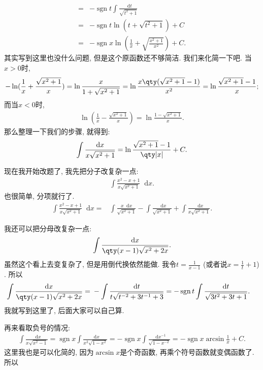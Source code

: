 \documentclass{ctexbook}
\DeclareMathOperator{\sgn}{sgn}
\newcommand*{\dif}{\mathop{}\!\mathrm{d}}
\begin{document}
{\begin{align*}
={}&-\sgn{t}\int\frac{\dif{t}}{\sqrt{t^{2}+1}}\\
={}&-\sgn{t}\ln(t+\sqrt{t^{2}+1})+C\\
={}&-\sgn{x}\ln(\frac{1}{x}+\sqrt{\frac{x^{2}+1}{x^{2}}})+C
.\end{align*}
其实写到这里也没什么问题, 但是这个原函数还不够简洁. 我们来化简一下吧. 当$x>0$时, 
\begin{align*}
-\ln(\frac{1}{x}+\frac{\sqrt{x^{2}+1}}{x})=\ln{\frac{x}{1+\sqrt{x^{2}+1}}}=\ln{\frac{x\qty(\sqrt{x^{2}+1}-1)}{x^{2}}}=\ln{\frac{\sqrt{x^{2}+1}-1}{x}}
;\end{align*}
而当$x<0$时, 
\begin{align*}
\ln(\frac{1}{x}-\frac{\sqrt{x^{2}+1}}{x})=\ln{\frac{1-\sqrt{x^{2}+1}}{x}}
.\end{align*}
那么整理一下我们的步骤, 就得到: 
\begin{align*}
\int\frac{\dif{x}}{x\sqrt{x^{2}+1}}=\ln{\frac{\sqrt{x^{2}+1}-1}{\qty|x|}}+C
.\end{align*}\par
现在我开始改题了, 我先把分子改复杂一点: 
\begin{align*}
\int\frac{x^{2}-x+1}{x\sqrt{x^{2}+1}}\dif{x}
.\end{align*}
也很简单, 分项就行了. 
\begin{align*}
\int\frac{x^{2}-x+1}{x\sqrt{x^{2}+1}}\dif{x}={}&\int\frac{x\dif{x}}{\sqrt{x^{2}+1}}-\int\frac{\dif{x}}{\sqrt{x^{2}+1}}+\int\frac{\dif{x}}{x\sqrt{x^{2}+1}}
.\end{align*}\par
我还可以把分母改复杂一点: 
\begin{align*}
\int\frac{\dif{x}}{\qty(x-1)\sqrt{x^{2}+2x}}
.\end{align*}
虽然这个看上去变复杂了, 但是用倒代换依然能做. 我令$t=\frac{1}{x-1}$ (或者说$x=\frac{1}{t}+1$) . 所以
\begin{align*}
\int\frac{\dif{x}}{\qty(x-1)\sqrt{x^{2}+2x}}={}&-\int\frac{\dif{t}}{t\sqrt{t^{-2}+3t^{-1}+3}}=-\sgn{t}\int\frac{\dif{t}}{\sqrt{3t^{2}+3t+1}}
.\end{align*}
我就写到这里了, 后面大家可以自己算. \par
再来看取负号的情况: 
\begin{align*}
\int\frac{\dif{x}}{x\sqrt{x^{2}-1}}=\sgn{x}\int\frac{\dif{x}}{x^{2}\sqrt{1-x^{2}}}=-\sgn{x}\int\frac{\dif{x^{-1}}}{\sqrt{1-x^{-2}}}=-\sgn{x}\arcsin{\frac{1}{x}}+C
.\end{align*}
这里我也是可以化简的, 因为$\arcsin{x}$是个奇函数, 再乘个符号函数就变偶函数了. 所以
\begin{align*}

\end{align*}}
\end{document}
